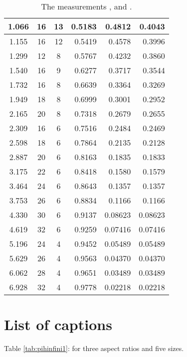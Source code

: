 \documentclass[a4paper,12pt]{article}
\begin{document}
\begin{table}[htbp]
\begin{center}
\begin{tabular}{|c|c|c|r|r|r|}
      1.066  & 16 & 13 & 0.5183 & 0.4812 & 0.4043  \\ \hline 
      1.155  & 16 & 12 & 0.5419 & 0.4578 & 0.3996  \\ \hline 
      1.299  & 12 & 8 & 0.5767 & 0.4232 & 0.3860  \\ \hline 
      1.540  & 16 & 9 & 0.6277 & 0.3717 & 0.3544  \\ \hline 
      1.732  & 16 & 8 & 0.6639 & 0.3364 & 0.3269  \\ \hline 
      1.949  & 18 & 8 & 0.6999 & 0.3001 & 0.2952  \\ \hline 
      2.165  & 20 & 8 & 0.7318 & 0.2679 & 0.2655  \\ \hline 
      2.309  & 16 & 6 & 0.7516 & 0.2484 & 0.2469  \\ \hline 
      2.598  & 18 & 6 & 0.7864 & 0.2135 & 0.2128  \\ \hline 
      2.887  & 20 & 6 & 0.8163 & 0.1835 & 0.1833  \\ \hline 
      3.175  & 22 & 6 & 0.8418 & 0.1580 & 0.1579  \\ \hline 
      3.464  & 24 & 6 & 0.8643 & 0.1357 & 0.1357  \\ \hline 
      3.753  & 26 & 6 & 0.8834 & 0.1166 & 0.1166  \\ \hline 
      4.330  & 30 & 6 & 0.9137 & 0.08623 & 0.08623  \\ \hline 
      4.619  & 32 & 6 & 0.9259 & 0.07416 & 0.07416  \\ \hline 
      5.196  & 24 & 4 & 0.9452 & 0.05489 & 0.05489  \\ \hline 
      5.629  & 26 & 4 & 0.9563 & 0.04370 & 0.04370  \\ \hline 
      6.062  & 28 & 4 & 0.9651 & 0.03489 & 0.03489  \\ \hline 
      6.928  & 32 & 4 & 0.9778 & 0.02218 & 0.02218  \\ \hline
  \end{tabular}
  \caption{The measurements \coordHE{}, \coordHE{} and \coordHE{}.}
  \label{tab:resultatspih}
\end{center}
\end{table}

\section*{List of captions}

\noindent Table \ref{tab:pihinfini1}: 
\coordHE{} for three aspect ratios \coordHE{} and five sizes.
\end{document}
